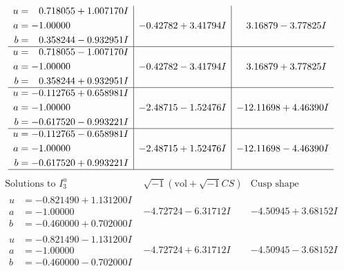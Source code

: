 \documentclass[1p]{elsarticle_modified}
\theoremstyle{definition}
\newcommand{\I}{\sqrt{-1}}
\begin{document}
$$\begin{array}{c|c|c}
\begin{aligned}
u &= \phantom{-}0.718055 + 1.007170 I \\
a &= -1.00000\phantom{ +0.000000I} \\
b &= \phantom{-}0.358244 - 0.932951 I\end{aligned}
 & -0.42782 + 3.41794 I & \phantom{-}3.16879 - 3.77825 I \\ \hline\begin{aligned}
u &= \phantom{-}0.718055 - 1.007170 I \\
a &= -1.00000\phantom{ +0.000000I} \\
b &= \phantom{-}0.358244 + 0.932951 I\end{aligned}
 & -0.42782 - 3.41794 I & \phantom{-}3.16879 + 3.77825 I \\ \hline\begin{aligned}
u &= -0.112765 + 0.658981 I \\
a &= -1.00000\phantom{ +0.000000I} \\
b &= -0.617520 - 0.993221 I\end{aligned}
 & -2.48715 - 1.52476 I & -12.11698 + 4.46390 I \\ \hline\begin{aligned}
u &= -0.112765 - 0.658981 I \\
a &= -1.00000\phantom{ +0.000000I} \\
b &= -0.617520 + 0.993221 I\end{aligned}
 & -2.48715 + 1.52476 I & -12.11698 - 4.46390 I\\
 \hline 
 \end{array}$$\newpage$$\begin{array}{c|c|c}  
\text{Solutions to }I^u_{3}& \I (\text{vol} + \sqrt{-1}CS) & \text{Cusp shape}\\
 \hline 
\begin{aligned}
u &= -0.821490 + 1.131200 I \\
a &= -1.00000\phantom{ +0.000000I} \\
b &= -0.460000 + 0.702000 I\end{aligned}
 & -4.72724 - 6.31712 I & -4.50945 + 3.68152 I \\ \hline\begin{aligned}
u &= -0.821490 - 1.131200 I \\
a &= -1.00000\phantom{ +0.000000I} \\
b &= -0.460000 - 0.702000 I\end{aligned}
 & -4.72724 + 6.31712 I & -4.50945 - 3.68152 I \\ \hline\begin{aligned}

\end{aligned}
\end{array}$$
\end{document}

